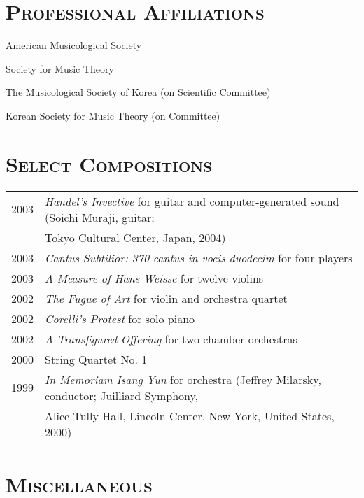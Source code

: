 \documentclass[a4paper,11pt]{article}
\begin{document}
  \section*{\textsc{Professional Affiliations}}
  
  American Musicological Society
  
  \noindent Society for Music Theory
  
  \noindent The Musicological Society of Korea (on Scientific Committee)
  
  \noindent Korean Society for Music Theory (on Committee)
  
  \section*{\textsc{Select Compositions}}
  
  \hspace*{-0.25cm}
  \begin{tabular}{p{2.5cm} p{12.5cm}}
  2003 & \textit{Handel’s Invective} for guitar and computer-generated sound (Soichi Muraji, guitar;\\
  & Tokyo Cultural Center, Japan, 2004)\\[2mm]
  
  2003 & \textit{Cantus Subtilior: 370 cantus in vocis duodecim} for four players\\[2mm]
  
  2003 & \textit{A Measure of Hans Weisse} for twelve violins\\[2mm]
  
  2002 & \textit{The Fugue of Art} for violin and orchestra quartet\\[2mm]
  
  2002 & \textit{Corelli’s Protest} for solo piano\\[2mm]
  
  2002 & \textit{A Transfigured Offering} for two chamber orchestras\\[2mm]
  
  2000 & String Quartet No. 1\\[2mm]
  
  1999 & \textit{In Memoriam Isang Yun} for orchestra (Jeffrey Milarsky, conductor; Juilliard Symphony,\\
  & Alice Tully Hall, Lincoln Center, New York, United States, 2000)
  \end{tabular}
  
  \vspace{2.5mm}
  
  \section*{\textsc{Miscellaneous}}
  
\end{document}
